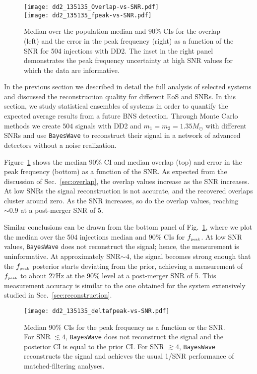 \documentclass[aps,prd,amsmath,floats,floatfix, twocolumn,
superscriptaddress,nofootinbib,showpacs]{revtex4-1}
\newcommand{\peak}{{\mbox{\tiny peak}}}
\begin{document}
%
\begin{figure}[h!]
\texttt{[image: dd2\_135135\_Overlap-vs-SNR.pdf]}\\
\texttt{[image: dd2\_135135\_fpeak-vs-SNR.pdf]}
 \caption{\label{fig:dd2_135135_Overlap-vs-SNR} Median over the population median and $90\%$ CIs for the overlap (left) and the error in the peak frequency (right) as a function of the SNR for 504 injections with DD2. The inset in the right panel demonstrates the peak frequency uncertainty at high SNR values for which the data are informative.}
\end{figure}
%
In the previous section we described in detail the full analysis of selected systems and discussed the reconstruction quality for different EoS and SNRs. In this section, we study statistical ensembles of systems in order to quantify the expected average results from a future BNS detection. Through Monte Carlo methods we create $504$ signals with DD2 and $m_1=m_2=1.35M_{\odot}$ with different SNRs and use {\tt BayesWave} to reconstruct their signal in a network of advanced detectors without a noise realization.

Figure~\ref{fig:dd2_135135_Overlap-vs-SNR} shows the median $90\%$ CI and median overlap (top) and error in the peak frequency (bottom) as a function of the SNR. As expected from the discussion of Sec.~\ref{sec:overlap}, the overlap values increase as the SNR increases. At low SNRs the signal reconstruction is not accurate, and the recovered overlaps cluster around zero. As the SNR increases, so do the overlap values, reaching $\sim 0.9$ at a post-merger SNR of 5.

Similar conclusions can be drawn from the bottom panel of Fig.~\ref{fig:dd2_135135_Overlap-vs-SNR}, where we plot the median over the 504 injections median and $90\%$ CIs for $f_{\peak}$. At low SNR values, {\tt BayesWave} does not reconstruct the signal; hence, the measurement is uninformative. At approximately SNR$\sim 4$, the signal becomes strong enough that the $f_{\peak}$ posterior starts deviating from the prior, achieving a measurement of $f_{\peak}$ to about $27$Hz at the $90\%$ level at a post-merger SNR of 5. This measurement accuracy is similar to the one obtained for the system extensively studied in Sec.~\ref{sec:reconstruction}.

%
\begin{figure}[h!]
\texttt{[image: dd2\_135135\_deltafpeak-vs-SNR.pdf]}
 \caption{\label{fig:dd2_135135_deltafpeak-vs-SNR} Median $90\%$ CIs for the peak frequency as a function or the SNR. For SNR $\lesssim 4$, {\tt BayesWave} does not reconstruct the signal and the posterior CI is equal to the prior CI. For  SNR $\gtrsim 4$, {\tt BayesWave} reconstructs the signal and achieves the usual 1/SNR performance of matched-filtering analyses.}
\end{figure}
%
\end{document}
